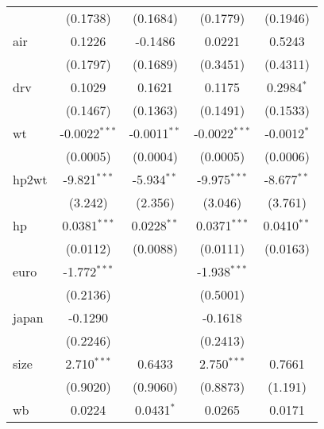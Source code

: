 \begin{table}[htbp]
\begin{tabular}{lcccc}
                                   & (0.1738)        & (0.1684)        & (0.1779)               & (0.1946)\\   
      air                          & 0.1226          & -0.1486         & 0.0221                 & 0.5243\\   
                                   & (0.1797)        & (0.1689)        & (0.3451)               & (0.4311)\\   
      drv                          & 0.1029          & 0.1621          & 0.1175                 & 0.2984$^{*}$\\   
                                   & (0.1467)        & (0.1363)        & (0.1491)               & (0.1533)\\   
      wt                           & -0.0022$^{***}$ & -0.0011$^{**}$  & -0.0022$^{***}$        & -0.0012$^{*}$\\   
                                   & (0.0005)        & (0.0004)        & (0.0005)               & (0.0006)\\   
      hp2wt                        & -9.821$^{***}$  & -5.934$^{**}$   & -9.975$^{***}$         & -8.677$^{**}$\\   
                                   & (3.242)         & (2.356)         & (3.046)                & (3.761)\\   
      hp                           & 0.0381$^{***}$  & 0.0228$^{**}$   & 0.0371$^{***}$         & 0.0410$^{**}$\\   
                                   & (0.0112)        & (0.0088)        & (0.0111)               & (0.0163)\\   
      euro                         & -1.772$^{***}$  &                 & -1.938$^{***}$         &   \\   
                                   & (0.2136)        &                 & (0.5001)               &   \\   
      japan                        & -0.1290         &                 & -0.1618                &   \\   
                                   & (0.2246)        &                 & (0.2413)               &   \\   
      size                         & 2.710$^{***}$   & 0.6433          & 2.750$^{***}$          & 0.7661\\   
                                   & (0.9020)        & (0.9060)        & (0.8873)               & (1.191)\\   
      wb                           & 0.0224          & 0.0431$^{*}$    & 0.0265                 & 0.0171\\   

\end{tabular}
\end{table}
